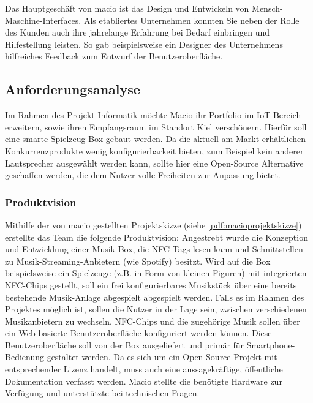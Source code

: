 \documentclass[10pt, a4paper]{article}
\begin{document}
\begin{onehalfspace}
Das Hauptgeschäft von macio ist das Design und Entwickeln von Mensch-Maschine-Interfaces.
Als etabliertes Unternehmen konnten Sie neben der Rolle des Kunden auch ihre jahrelange Erfahrung bei Bedarf einbringen und Hilfestellung leisten.
So gab beispielsweise ein Designer des Unternehmens hilfreiches Feedback zum Entwurf der Benutzeroberfläche.
\subsection{Anforderungsanalyse}
Im Rahmen des Projekt Informatik möchte Macio ihr Portfolio im IoT-Bereich erweitern, sowie ihren Empfangsraum im Standort Kiel verschönern.
Hierfür soll eine smarte Spielzeug-Box gebaut werden.
Da die aktuell am Markt erhältlichen Konkurrenzprodukte wenig konfigurierbarkeit bieten, zum Beispiel kein anderer Lautsprecher ausgewählt werden kann, sollte hier eine Open-Source Alternative geschaffen werden, die dem Nutzer volle Freiheiten zur Anpassung bietet.
\subsubsection{Produktvision}
Mithilfe der von macio gestellten Projektskizze (siehe \ref{pdf:macioprojektskizze}) erstellte das Team die folgende Produktvision:
Angestrebt wurde die Konzeption und Entwicklung einer Musik-Box, die NFC Tags lesen kann und Schnittstellen zu Musik-Streaming-Anbietern (wie Spotify) besitzt.
Wird auf die Box beispielsweise ein Spielzeuge (z.B. in Form von kleinen Figuren) mit integrierten NFC-Chips gestellt, soll ein frei konfigurierbares Musikstück über eine bereits bestehende Musik-Anlage abgespielt abgespielt werden.
Falls es im Rahmen des Projektes möglich ist, sollen die Nutzer in der Lage sein, zwischen verschiedenen Musikanbietern zu wechseln.
NFC-Chips und die zugehörige Musik sollen über ein Web-basierte Benutzeroberfläche konfiguriert werden können.
Diese Benutzeroberfläche soll von der Box ausgeliefert und primär für Smartphone-Bedienung gestaltet werden.
Da es sich um ein Open Source Projekt mit entsprechender Lizenz handelt, muss auch eine aussagekräftige, öffentliche Dokumentation verfasst werden.
Macio stellte die benötigte Hardware zur Verfügung und unterstützte bei technischen Fragen.\\


\end{onehalfspace}
\end{document}
